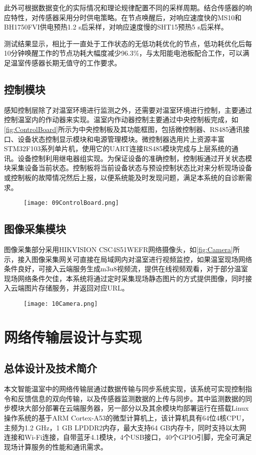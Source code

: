此外可根据数据变化的实际情况和理论规律配置不同的采样周期。结合传感器的响应特性，对传感器采用分时供电策略。在节点唤醒后，对响应速度快的MS10和BH1750FVI供电预热1.2 s后采样，对响应速度慢的SHT15预热5 s后采样。

测试结果显示，相比于一直处于工作状态的无低功耗优化的节点，低功耗优化后每10分钟唤醒工作的节点功耗大幅度减少96.3\%，与太阳能电池板配合工作，可以满足温室传感器长期无值守的工作要求。

	\subsection{控制模块}
	感知控制层除了对温室环境进行监测之外，还需要对温室环境进行控制，主要通过控制温室内的作动器来实现。温室内作动器控制主要通过中央控制板完成，如\ref{fig:ControlBoard}所示为中央控制板及其功能框图，包括微控制器、RS485通讯接口、设备状态控制显示模块和电源管理模块。微控制器选用片上资源丰富STM32F103系列单片机，使用它的UART连接RS485模块完成与上层系统的通讯。设备控制利用继电器组实现。为保证设备的准确控制，控制板通过开关状态模块采集设备当前状态。控制板将当前设备状态与预设控制状态比对来分析现场设备或控制板的故障情况然后上报，以便系统能及时发现问题，满足本系统的自诊断需求。
	  	\begin{figure}[!htp]
  			\centering
 			\texttt{[image: 09ControlBoard.png]}
		\end{figure}
	\subsection{图像采集模块}
图像采集部分采用HIKVISION CSC4S51WEFR网络摄像头，如\ref{fig:Camera}所示，接入图像采集网关可直接在局域网内对温室进行视频监控，如果温室现场网络条件良好，可接入云端服务生成m3u8视频流，提供在线视频观看，对于部分温室现场网络条件欠佳，本系统将通过定时采集现场静态图片的方式提供图像，同时接入云端图片存储服务，并返回对应URL。
	  	\begin{figure}[!htp]
  			\centering
 			\texttt{[image: 10Camera.png]}
		\end{figure}
\section{网络传输层设计与实现}
	\subsection{总体设计及技术简介}
	本文智能温室中的网络传输层通过数据传输与同步系统实现，该系统可实现控制指令和反馈信息的双向传输，以及传感器监测数据的上传与同步。其中监测数据的同步模块大部分部署在云端服务器，另一部分以及其余模块均部署运行在搭载Linux操作系统的基于ARM Cortex-A53的微型计算机上，该计算机具有64位4核CPU，主频为1.2 GHz，1 GB LPDDR2内存，最大支持64 GB内存卡，同时支持以太网连接和Wi-Fi连接，自带蓝牙4.1模块，4个USB接口，40个GPIO引脚，完全可满足现场计算服务的性能和通讯需求。
	
